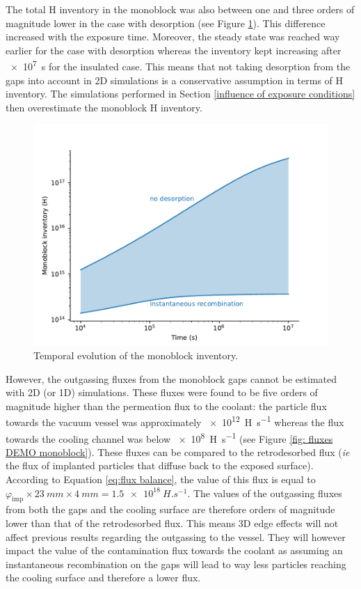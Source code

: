 The total H inventory in the monoblock was also between one and three orders of magnitude lower in the case with desorption (see Figure \ref{fig: inventory vs time DEMO monoblock}).
This difference increased with the exposure time.
Moreover, the steady state was reached way earlier for the case with desorption whereas the inventory kept increasing after \SI{e7}{s} for the insulated case.
This means that not taking desorption from the gaps into account in 2D simulations is a conservative assumption in terms of H inventory.
The simulations performed in Section \ref{influence of exposure conditions} then overestimate the monoblock H inventory.

\begin{figure} [h]
    \centering
    \includegraphics[width=\linewidth]{Figures/Chapter3/monoblocks/3D_monoblocks/inventory.pdf}
    \caption{Temporal evolution of the monoblock inventory.}
    \label{fig: inventory vs time DEMO monoblock}
\end{figure}

However, the outgassing fluxes from the monoblock gaps cannot be estimated with 2D (or 1D) simulations.
These fluxes were found to be five orders of magnitude higher than the permeation flux to the coolant: the particle flux towards the vacuum vessel was approximately \SI{e12}{H.s^{-1}} whereas the flux towards the cooling channel was below \SI{e8}{H.s^{-1}} (see Figure \ref{fig: fluxes DEMO monoblock}).
These fluxes can be compared to the retrodesorbed flux (\textit{ie} the flux of implanted particles that diffuse back to the exposed surface).
According to Equation \ref{eq:flux balance}, the value of this flux is equal to $\varphi_\mathrm{imp} \times \SI{23}{mm} \times \SI{4}{mm} = \SI{1.5e18}{H.s^{-1}}$.
The values of the outgassing fluxes from both the gaps and the cooling surface are therefore orders of magnitude lower than that of the retrodesorbed flux.
This means 3D edge effects will not affect previous results regarding the outgassing to the vessel.
They will however impact the value of the contamination flux towards the coolant as assuming an instantaneous recombination on the gaps will lead to way less particles reaching the cooling surface and therefore a lower flux.

